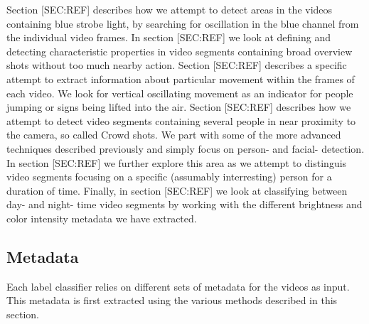 Section [SEC:REF] describes how we attempt to detect areas in the videos containing blue strobe light, by searching for oscillation in the blue channel from the individual video frames. In section [SEC:REF] we look at defining and detecting characteristic properties in video segments containing broad overview shots without too much nearby action. Section [SEC:REF] describes a specific attempt to extract information about particular movement within the frames of each video. We look for vertical oscillating movement as an indicator for people jumping or signs being lifted into the air. Section [SEC:REF] describes how we attempt to detect video segments containing several people in near proximity to the camera, so called Crowd shots. We part with some of the more advanced techniques described previously and simply focus on person- and facial- detection. In section [SEC:REF] we further explore this area as we attempt to distinguis video segments focusing on a specific (assumably interresting) person for a duration of time. Finally, in section [SEC:REF] we look at classifying between day- and night- time video segments by working with the different brightness and color intensity metadata we have extracted.
%
\subsection{Metadata}
%
Each label classifier relies on different sets of metadata for the videos as input. This metadata is first extracted using the various methods described in this section.
%
